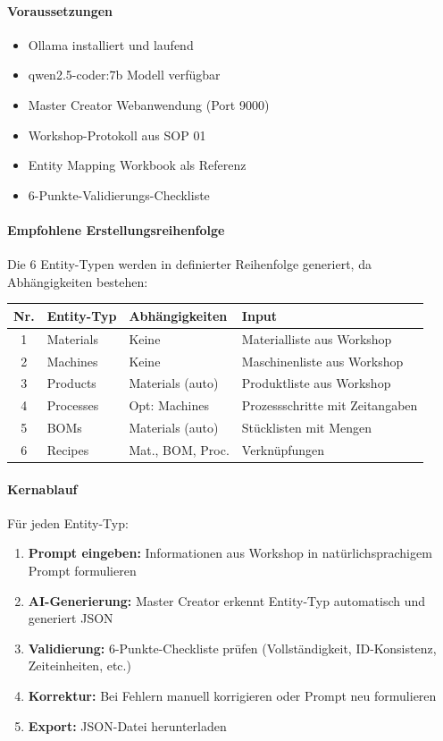 \paragraph{Voraussetzungen}

\begin{itemize}
    \item Ollama installiert und laufend
    \item qwen2.5-coder:7b Modell verfügbar
    \item Master Creator Webanwendung (Port 9000)
    \item Workshop-Protokoll aus SOP 01
    \item Entity Mapping Workbook als Referenz
    \item 6-Punkte-Validierungs-Checkliste
\end{itemize}

\paragraph{Empfohlene Erstellungsreihenfolge}

Die 6 Entity-Typen werden in definierter Reihenfolge generiert, da Abhängigkeiten bestehen:

\begin{table}[h]
\centering
\begin{tabular}{clll}
\toprule
\textbf{Nr.} & \textbf{Entity-Typ} & \textbf{Abhängigkeiten} & \textbf{Input} \\
\midrule
1 & Materials & Keine & Materialliste aus Workshop \\
2 & Machines & Keine & Maschinenliste aus Workshop \\
3 & Products & Materials (auto) & Produktliste aus Workshop \\
4 & Processes & Opt: Machines & Prozessschritte mit Zeitangaben \\
5 & BOMs & Materials (auto) & Stücklisten mit Mengen \\
6 & Recipes & Mat., BOM, Proc. & Verknüpfungen \\
\bottomrule
\end{tabular}
\end{table}

\paragraph{Kernablauf}

Für jeden Entity-Typ:

\begin{enumerate}
    \item \textbf{Prompt eingeben:} Informationen aus Workshop in natürlichsprachigem Prompt formulieren
    \item \textbf{AI-Generierung:} Master Creator erkennt Entity-Typ automatisch und generiert JSON
    \item \textbf{Validierung:} 6-Punkte-Checkliste prüfen (Vollständigkeit, ID-Konsistenz, Zeiteinheiten, etc.)
    \item \textbf{Korrektur:} Bei Fehlern manuell korrigieren oder Prompt neu formulieren
    \item \textbf{Export:} JSON-Datei herunterladen
\end{enumerate}

